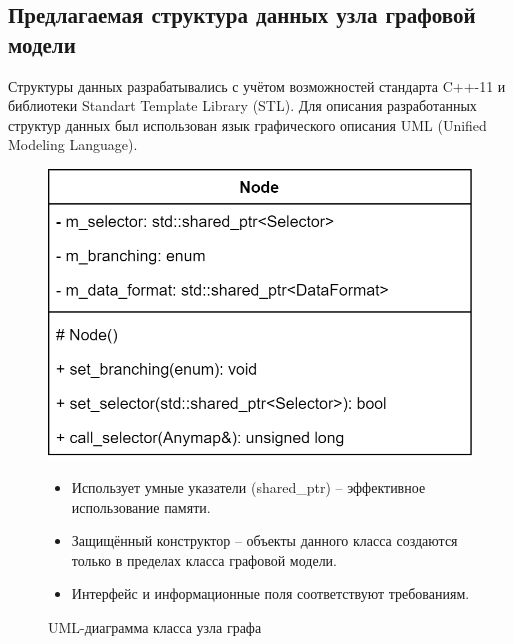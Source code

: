 \subsection{Предлагаемая структура данных узла графовой модели}
\begin{frame}%
	Структуры данных разрабатывались с учётом возможностей стандарта C++-11 и библиотеки Standart Template Library (STL). Для описания разработанных структур данных был использован язык графического описания UML (Unified Modeling Language).
	\begin{figure}
		\begin{minipage}{0.49\textwidth}
			\centering
			\includegraphics[width=\textwidth]{images/class.node.png}
			\caption{UML-диаграмма класса узла графа}
		\end{minipage}\hfill\begin{minipage}{0.49\textwidth}
			\begin{itemize}
				\item Использует умные указатели (\textsf{shared_ptr}) -- эффективное использование памяти.
				\item Защищённый конструктор -- объекты данного класса создаются только в пределах класса графовой модели.
				\item Интерфейс и информационные поля соответствуют требованиям.
			\end{itemize}
		\end{minipage}
	\end{figure}
\end{frame}

